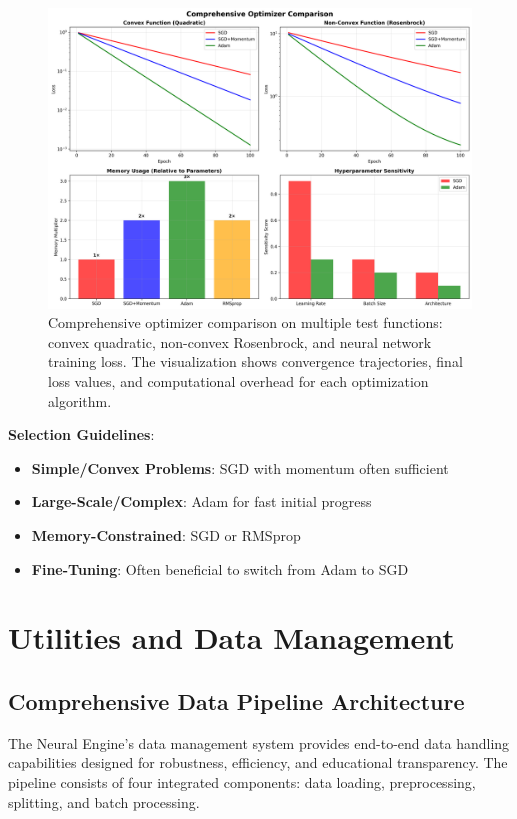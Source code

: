 \documentclass[11pt,a4paper]{report}
\begin{document}
\begin{figure}[H]
\centering
\includegraphics[width=\textwidth]{optimizer_comprehensive_comparison.png}
\caption{Comprehensive optimizer comparison on multiple test functions: convex quadratic, non-convex Rosenbrock, and neural network training loss. The visualization shows convergence trajectories, final loss values, and computational overhead for each optimization algorithm.}
\label{fig:optimizer_comparison}
\end{figure}

\textbf{Selection Guidelines}:
\begin{itemize}
\item \textbf{Simple/Convex Problems}: SGD with momentum often sufficient
\item \textbf{Large-Scale/Complex}: Adam for fast initial progress
\item \textbf{Memory-Constrained}: SGD or RMSprop
\item \textbf{Fine-Tuning}: Often beneficial to switch from Adam to SGD
\end{itemize}

\section{Utilities and Data Management}

\subsection{Comprehensive Data Pipeline Architecture}

The Neural Engine's data management system provides end-to-end data handling capabilities designed for robustness, efficiency, and educational transparency. The pipeline consists of four integrated components: data loading, preprocessing, splitting, and batch processing.
\end{document}
